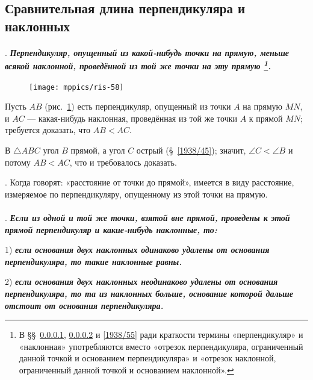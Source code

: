 \documentclass[oneside]{book}
\begin{document}
\subsection*{Сравнительная длина перпендикуляра и наклонных}

{\sloppy

\paragraph{}\label{1938/53}
.
\textbf{\emph{Перпендикуляр, опущенный из какой-нибудь точки на прямую, меньше всякой наклонной, проведённой из той же точки на эту прямую%
\footnote{В §§~\ref{1938/53}, \ref{1938/54} и \ref{1938/55} ради краткости термины «перпендикуляр» и «наклонная» употребляются вместо «отрезок перпендикуляра, ограниченный данной точкой и основанием перпендикуляра» и «отрезок наклонной, ограниченный данной точкой и основанием наклонной».}.%
}}

}

\begin{figure}
\centering
\texttt{[image: mppics/ris-58]}
\caption{}\label{1938/ris-58}
\end{figure}

Пусть $AB$ (рис.~\ref{1938/ris-58}) есть перпендикуляр, опущенный из точки $A$ на прямую $MN$, и $AC$ — какая-нибудь наклонная, проведённая из той же точки $A$ к прямой $MN$;
требуется доказать, что $AB<AC$.

В $\triangle ABC$ угол $B$ прямой, а угол $C$ острый (§~\ref{1938/45});
значит, $\angle C<\angle B$ и потому $AB<AC$, что и требовалось доказать.

\smallskip
\mbox{.}
Когда говорят:
«расстояние от точки до прямой», имеется в виду  расстояние, измеряемое по перпендикуляру, опущенному из этой точки на прямую.

\paragraph{}\label{1938/54}
\mbox{.}
\textbf{\emph{Если из одной и той же точки, взятой вне прямой, проведены к этой прямой перпендикуляр и какие-нибудь наклонные, то:}}

1) \textbf{\emph{если основания двух наклонных одинаково удалены от основания перпендикуляра, то такие наклонные равны.}}

2) \textbf{\emph{если основания двух наклонных неодинаково удалены от основания перпендикуляра, то та из наклонных больше, основание которой дальше отстоит от основания перпендикуляра.}}
\end{document}
